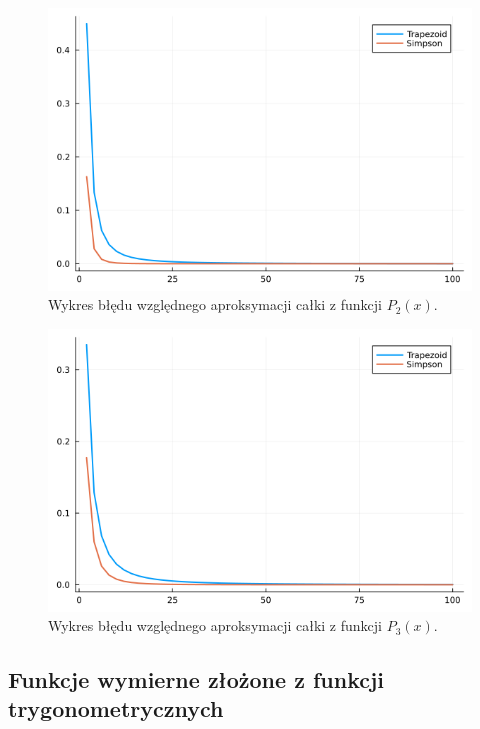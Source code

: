 \documentclass{article}
\theoremstyle{definition}
\begin{document}
\begin{figure}[h!]
    \centering
    \includegraphics[scale=0.5]{plot_P2.png}
    \caption{Wykres błędu względnego aproksymacji całki z funkcji \(P_2(x)\).}
    \label{fig:plot_P2}
\end{figure}


\begin{figure}[h!]
    \centering
    \includegraphics[scale=0.5]{plot_P3.png}
    \caption{Wykres błędu względnego aproksymacji całki z funkcji \(P_3(x)\).}
    \label{fig:plot_P3}
\end{figure}

\clearpage

\subsection{Funkcje wymierne złożone z funkcji trygonometrycznych}
\end{document}
